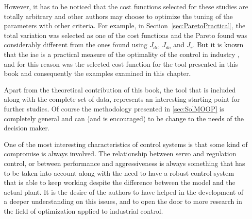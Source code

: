 However, it has to be noticed that the cost functions selected for these studies are totally arbitrary and other authors may choose to optimize the tuning of the parameters with other criteria. For example, in Section~\ref{sec:ParetoPractical}, the total variation was selected as one of the cost functions and the Pareto found was considerably different from the ones found using $J_{di}$, $J_{do}$ and $J_r$. But it is known that the \gls{iae} is a practical measure of the optimality of the control in industry \citep{Shinskey2002}, and for this reason was the selected cost function for the tool presented in this book and consequently the examples examined in this chapter.

Apart from the theoretical contribution of this book, the \matlab tool that is included along with the complete set of data, represents an interesting starting point for further studies. Of course the methodology presented in \ref{sec:SolMOOP} is completely general and can (and is encouraged) to be change to the needs of the decision maker.

One of the most interesting characteristics of control systems is that some kind of compromise is always involved. The relationship between servo and regulation control, or between performance and aggressiveness is always something that has to be taken into account along with the need to have a robust control system that is able to keep working despite the difference between the model and the actual plant. It is the desire of the authors to have helped in the development of a deeper understanding on this issues, and to open the door to more research in the field of optimization applied to industrial control.


